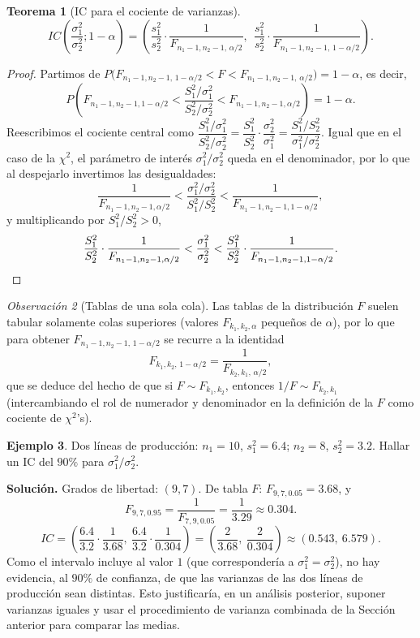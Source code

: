 \documentclass[11pt,a4paper]{article}
\theoremstyle{plain}
\newtheorem{teorema}{Teorema}[section]
\theoremstyle{definition}
\newtheorem{ejemplo}[teorema]{Ejemplo}
\theoremstyle{remark}
\newtheorem{observacion}[teorema]{Observación}
\begin{document}
\begin{teorema}[IC para el cociente de varianzas]
\[
IC\left(\frac{\sigma_1^2}{\sigma_2^2};1-\alpha\right) = \left(\frac{s_1^2}{s_2^2}\cdot\frac{1}{F_{n_1-1,n_2-1,\,\alpha/2}},\ \ \frac{s_1^2}{s_2^2}\cdot\frac{1}{F_{n_1-1,n_2-1,\,1-\alpha/2}}\right).
\]
\end{teorema}

\begin{proof}
Partimos de $P\big(F_{n_1-1,n_2-1,\,1-\alpha/2} < F < F_{n_1-1,n_2-1,\,\alpha/2}\big)=1-\alpha$, es decir,
\[
P\left(F_{n_1-1,n_2-1,1-\alpha/2} < \frac{S_1^2/\sigma_1^2}{S_2^2/\sigma_2^2} < F_{n_1-1,n_2-1,\alpha/2}\right) = 1-\alpha.
\]
Reescribimos el cociente central como $\dfrac{S_1^2/\sigma_1^2}{S_2^2/\sigma_2^2} = \dfrac{S_1^2}{S_2^2}\cdot\dfrac{\sigma_2^2}{\sigma_1^2} = \dfrac{S_1^2/S_2^2}{\sigma_1^2/\sigma_2^2}$. Igual que en el caso de la $\chi^2$, el parámetro de interés $\sigma_1^2/\sigma_2^2$ queda en el denominador, por lo que al despejarlo invertimos las desigualdades:
\[
\frac{1}{F_{n_1-1,n_2-1,\alpha/2}} < \frac{\sigma_1^2/\sigma_2^2}{S_1^2/S_2^2} < \frac{1}{F_{n_1-1,n_2-1,1-\alpha/2}},
\]
y multiplicando por $S_1^2/S_2^2>0$,
\[
\frac{S_1^2}{S_2^2}\cdot\frac{1}{F_{n_1-1,n_2-1,\alpha/2}} < \frac{\sigma_1^2}{\sigma_2^2} < \frac{S_1^2}{S_2^2}\cdot\frac{1}{F_{n_1-1,n_2-1,1-\alpha/2}}. \qedhere
\]
\end{proof}

\begin{observacion}[Tablas de una sola cola]
Las tablas de la distribución $F$ suelen tabular solamente colas superiores (valores $F_{k_1,k_2,\alpha}$ pequeños de $\alpha$), por lo que para obtener $F_{n_1-1,n_2-1,\,1-\alpha/2}$ se recurre a la identidad
\[
F_{k_1,k_2,\,1-\alpha/2} = \frac{1}{F_{k_2,k_1,\,\alpha/2}},
\]
que se deduce del hecho de que si $F\sim F_{k_1,k_2}$, entonces $1/F\sim F_{k_2,k_1}$ (intercambiando el rol de numerador y denominador en la definición de la $F$ como cociente de $\chi^2$'s).
\end{observacion}

\begin{ejemplo}
Dos líneas de producción: $n_1=10$, $s_1^2=6.4$; $n_2=8$, $s_2^2=3.2$. Hallar un IC del $90\%$ para $\sigma_1^2/\sigma_2^2$.

\textbf{Solución.} Grados de libertad: $(9,7)$. De tabla $F$: $F_{9,7,0.05}=3.68$, y
\[
F_{9,7,0.95} = \frac{1}{F_{7,9,0.05}} = \frac{1}{3.29} \approx 0.304.
\]
\[
IC = \left(\frac{6.4}{3.2}\cdot\frac{1}{3.68},\ \frac{6.4}{3.2}\cdot\frac{1}{0.304}\right) = \left(\frac{2}{3.68},\ \frac{2}{0.304}\right) \approx (0.543,\ 6.579).
\]
Como el intervalo incluye al valor $1$ (que correspondería a $\sigma_1^2=\sigma_2^2$), no hay evidencia, al $90\%$ de confianza, de que las varianzas de las dos líneas de producción sean distintas. Esto justificaría, en un análisis posterior, suponer varianzas iguales y usar el procedimiento de varianza combinada de la Sección anterior para comparar las medias.
\end{ejemplo}
\end{document}
